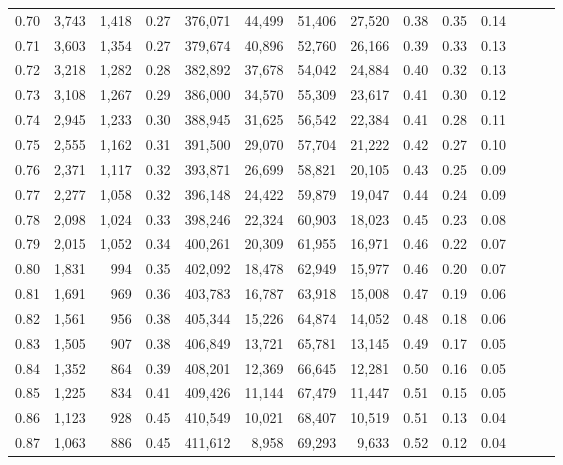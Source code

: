 \begin{tabular}{rrrrrrrrrrrrrr}
0.70 &   3,743 &  1,418 &  0.27 &  376,071 &   44,499 &  51,406 &  27,520 &  0.38 &  0.35 &      0.14 \\
0.71 &   3,603 &  1,354 &  0.27 &  379,674 &   40,896 &  52,760 &  26,166 &  0.39 &  0.33 &      0.13 \\
0.72 &   3,218 &  1,282 &  0.28 &  382,892 &   37,678 &  54,042 &  24,884 &  0.40 &  0.32 &      0.13 \\
0.73 &   3,108 &  1,267 &  0.29 &  386,000 &   34,570 &  55,309 &  23,617 &  0.41 &  0.30 &      0.12 \\
0.74 &   2,945 &  1,233 &  0.30 &  388,945 &   31,625 &  56,542 &  22,384 &  0.41 &  0.28 &      0.11 \\
0.75 &   2,555 &  1,162 &  0.31 &  391,500 &   29,070 &  57,704 &  21,222 &  0.42 &  0.27 &      0.10 \\
0.76 &   2,371 &  1,117 &  0.32 &  393,871 &   26,699 &  58,821 &  20,105 &  0.43 &  0.25 &      0.09 \\
0.77 &   2,277 &  1,058 &  0.32 &  396,148 &   24,422 &  59,879 &  19,047 &  0.44 &  0.24 &      0.09 \\
0.78 &   2,098 &  1,024 &  0.33 &  398,246 &   22,324 &  60,903 &  18,023 &  0.45 &  0.23 &      0.08 \\
0.79 &   2,015 &  1,052 &  0.34 &  400,261 &   20,309 &  61,955 &  16,971 &  0.46 &  0.22 &      0.07 \\
0.80 &   1,831 &    994 &  0.35 &  402,092 &   18,478 &  62,949 &  15,977 &  0.46 &  0.20 &      0.07 \\
0.81 &   1,691 &    969 &  0.36 &  403,783 &   16,787 &  63,918 &  15,008 &  0.47 &  0.19 &      0.06 \\
0.82 &   1,561 &    956 &  0.38 &  405,344 &   15,226 &  64,874 &  14,052 &  0.48 &  0.18 &      0.06 \\
0.83 &   1,505 &    907 &  0.38 &  406,849 &   13,721 &  65,781 &  13,145 &  0.49 &  0.17 &      0.05 \\
0.84 &   1,352 &    864 &  0.39 &  408,201 &   12,369 &  66,645 &  12,281 &  0.50 &  0.16 &      0.05 \\
0.85 &   1,225 &    834 &  0.41 &  409,426 &   11,144 &  67,479 &  11,447 &  0.51 &  0.15 &      0.05 \\
0.86 &   1,123 &    928 &  0.45 &  410,549 &   10,021 &  68,407 &  10,519 &  0.51 &  0.13 &      0.04 \\
0.87 &   1,063 &    886 &  0.45 &  411,612 &    8,958 &  69,293 &   9,633 &  0.52 &  0.12 &      0.04 \\

\end{tabular}
